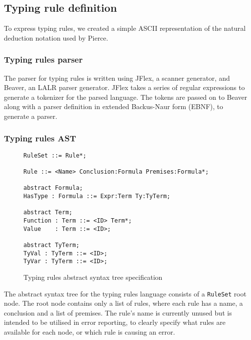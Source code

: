 \documentclass[nofilelist]{cslthse-msc}
\newcommand{\CR}[1]{\textcolor{green!60!black}{[\textbf{CR}:#1]}}
\begin{document}
\subsection{Typing rule definition}\label{typingruledefinition}
To express typing rules, we created a simple ASCII representation of the natural deduction notation used by Pierce\cite{Pierce}.


\subsubsection{Typing rules parser}\label{typingrulesparser}
The parser for typing rules is written using JFlex\cite{jflex}, a scanner generator, and Beaver\cite{beaver}, an LALR parser generator.
JFlex takes a series of regular expressions to generate a tokenizer for the parsed language.
The tokens are passed on to Beaver along with a parser definition in extended Backus-Naur form (EBNF), to generate a parser.


\subsubsection{Typing rules AST}\label{typingrulesast}
\begin{figure}[h]
\begin{lstlisting}[]
RuleSet ::= Rule*;

Rule ::= <Name> Conclusion:Formula Premises:Formula*;

abstract Formula;
HasType : Formula ::= Expr:Term Ty:TyTerm;

abstract Term;
Function : Term ::= <ID> Term*;
Value    : Term ::= <ID>;

abstract TyTerm;
TyVal : TyTerm ::= <ID>;
TyVar : TyTerm ::= <ID>;
\end{lstlisting}
  \caption{Typing rules abstract syntax tree specification}
  \label{trastspec}
\end{figure}

The abstract syntax tree for the typing rules language consists of a \lstinline{RuleSet} root node.
The root node contains only a list of rules, where each rule has a name, a conclusion and a list of premises.
The rule's name is currently unused but is intended to be utilised in error reporting, to clearly specify what rules are available for each node, or which rule is causing an error.
\end{document}
